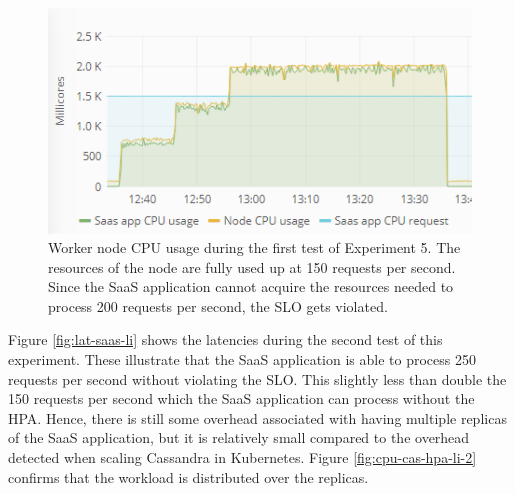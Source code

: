 \begin{figure}
\centering
\includegraphics[width=0.75\columnwidth]{Images/Experiments/CPU/Grafana/cpu-saas-li.PNG}
\caption{Worker node CPU usage during the first test of Experiment 5. The resources of the node are fully used up at 150 requests per second. Since the SaaS application cannot acquire the resources needed to process 200 requests per second, the SLO gets violated.}
\label{fig:cpu-saas-li}
\end{figure}

Figure \ref{fig:lat-saas-li} shows the latencies during the second test of this experiment. These illustrate that the SaaS application is able to process 250 requests per second without violating the SLO. This slightly less than double the 150 requests per second which the SaaS application can process without the HPA. Hence, there is still some overhead associated with having multiple replicas of the SaaS application, but it is relatively small compared to the overhead detected when scaling Cassandra in Kubernetes. Figure \ref{fig:cpu-cas-hpa-li-2} confirms that the workload is distributed over the replicas.
%



